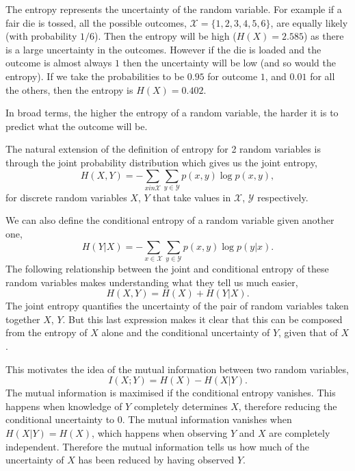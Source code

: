 \documentclass[10pt,a4paper]{book}
\begin{document}
The entropy represents the uncertainty of the random variable. For example if a fair die is tossed, all the possible outcomes, $\mathcal{X} = \{1,2,3,4,5,6\}$, are equally likely (with probability $1/6$). Then the entropy will be high ($H(X)= 2.585 $) as there is a large uncertainty in the outcomes. However if the die is loaded and the outcome is almost always $1$ then the uncertainty will be low (and so would the entropy). If we take the probabilities to be $0.95$ for outcome $1$, and $0.01$ for all the others, then the entropy is $H(X) = 0.402$.

In broad terms, the higher the entropy of a random variable, the harder it is to predict what the outcome will be.

The natural extension of the definition of entropy for 2 random variables is through the joint probability distribution which gives us the joint entropy,
\begin{equation}
H(X,Y) = - \sum_{x in \mathcal{X}} \sum_{y \in \mathcal{Y}}p(x,y) \log p(x,y),
\end{equation}
for discrete random variables $X$, $Y$ that take values in $\mathcal{X}$, $\mathcal{Y}$ respectively.

We can also define the conditional entropy of a random variable given another one,
\begin{equation}
H(Y|X) = - \sum_{x \in \mathcal{X}} \sum_{y \in \mathcal{Y}} p(x,y) \log p(y|x).
\end{equation}
The following relationship between the joint and conditional entropy of these random variables makes understanding what they tell us much easier,
\begin{equation}
H(X,Y) = H(X) + H(Y | X).
\end{equation}
The joint entropy quantifies the uncertainty of the pair of random variables taken together $X$, $Y$. But this last expression makes it clear that this can be composed from the entropy of $X$ alone and the conditional uncertainty of $Y$, given that of $X$.

This motivates the idea of the mutual information between two random variables,
\begin{equation}
I(X;Y) = H(X) - H(X|Y).
\end{equation}
The mutual information is maximised if the conditional entropy vanishes. This happens when knowledge of $Y$ completely determines $X$, therefore reducing the conditional uncertainty to 0. The mutual information vanishes when $H(X|Y)= H(X)$, which happens when observing $Y$ and $X$ are completely independent. Therefore the mutual information tells us how much of the uncertainty of $X$ has been reduced by having observed $Y$.
\end{document}
